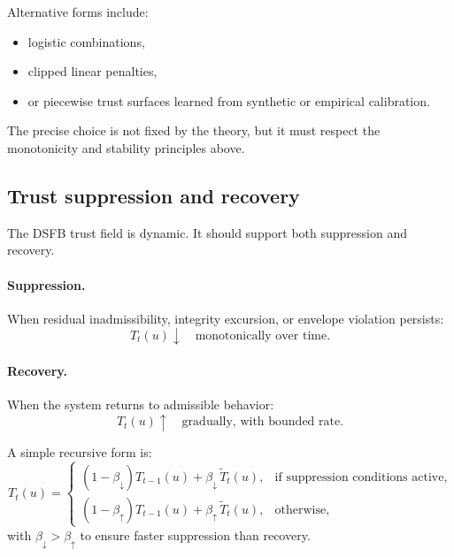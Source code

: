 \documentclass[11pt]{article}
\theoremstyle{definition}
\theoremstyle{plain}
\begin{document}
Alternative forms include:
\begin{itemize}[leftmargin=1.5em]
    \item logistic combinations,
    \item clipped linear penalties,
    \item or piecewise trust surfaces learned from synthetic or empirical calibration.
\end{itemize}

The precise choice is not fixed by the theory, but it must respect the monotonicity and stability principles above.


\subsection{Trust suppression and recovery}

The DSFB trust field is dynamic. It should support both suppression and recovery.

\paragraph{Suppression.}
When residual inadmissibility, integrity excursion, or envelope violation persists:
\begin{equation}
T_t(u)\downarrow \quad \text{monotonically over time}.
\end{equation}

\paragraph{Recovery.}
When the system returns to admissible behavior:
\begin{equation}
T_t(u)\uparrow \quad \text{gradually, with bounded rate}.
\end{equation}

A simple recursive form is:
\begin{equation}
T_t(u)=
\begin{cases}
(1-\beta_{\downarrow})T_{t-1}(u) + \beta_{\downarrow}\,\tilde T_t(u), & \text{if suppression conditions active},\\
(1-\beta_{\uparrow})T_{t-1}(u) + \beta_{\uparrow}\,\tilde T_t(u), & \text{otherwise},
\end{cases}
\end{equation}
with $\beta_{\downarrow}>\beta_{\uparrow}$ to ensure faster suppression than recovery.
\end{document}
